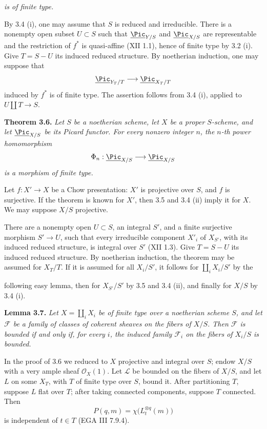 \emph{is of finite type.}

By 3.4 (i), one may assume that \(S\) is reduced and irreducible. There
is a nonempty open subset \(U\subset S\) such that
\(\underline{\Pic}_{Y/S}\) and \(\underline{\Pic}_{X/S}\) are
representable and the restriction of \(f^*\) is quasi-affine (XII 1.1),
hence of finite type by 3.2 (i). Give \(T=S-U\) its induced reduced
structure. By noetherian induction, one may suppose that
\[
\underline{\Pic}_{Y_T/T}\longrightarrow\underline{\Pic}_{X_T/T}
\]
induced by \(f^*\) is of finite type. The assertion follows from 3.4 (i),
applied to \(U\amalg T\to S\).

\textbf{Theorem 3.6.} \emph{Let \(S\) be a noetherian scheme, let \(X\)
be a proper \(S\)-scheme, and let \(\underline{\Pic}_{X/S}\) be its
Picard functor. For every nonzero integer \(n\), the \(n\)-th power
homomorphism}
\[
\Phi_n:\underline{\Pic}_{X/S}\longrightarrow\underline{\Pic}_{X/S}
\]
\emph{is a morphism of finite type.}

Let \(f:X'\to X\) be a Chow presentation: \(X'\) is projective over \(S\),
and \(f\) is surjective. If the theorem is known for \(X'\), then 3.5 and
3.4 (ii) imply it for \(X\). We may suppose \(X/S\) projective.

There are a nonempty open \(U\subset S\), an integral \(S'\), and a
finite surjective morphism \(S'\to U\), such that every irreducible
component \(X'_i\) of \(X_{S'}\), with its induced reduced structure, is
integral over \(S'\) (XII 1.3). Give \(T=S-U\) its induced reduced
structure. By noetherian induction, the theorem may be assumed for
\(X_T/T\). If it is assumed for all \(X_i/S'\), it follows for
\(\coprod_iX_i/S'\) by the

following easy lemma, then for \(X_{S'}/S'\) by 3.5 and 3.4 (ii), and
finally for \(X/S\) by 3.4 (i).

\textbf{Lemma 3.7.} \emph{Let \(X=\coprod_iX_i\) be of finite type over a
noetherian scheme \(S\), and let \(\mathcal F\) be a family of classes of
coherent sheaves on the fibers of \(X/S\). Then \(\mathcal F\) is bounded
if and only if, for every \(i\), the induced family \(\mathcal F_i\) on
the fibers of \(X_i/S\) is bounded.}

In the proof of 3.6 we reduced to \(X\) projective and integral over \(S\);
endow \(X/S\) with a very ample sheaf \(\mathcal O_X(1)\). Let
\(\mathscr L\) be bounded on the fibers of \(X/S\), and let \(L\) on some
\(X_T\), with \(T\) of finite type over \(S\), bound it. After
partitioning \(T\), suppose \(L\) flat over \(T\); after taking connected
components, suppose \(T\) connected. Then
\[
P(q,m)=\chi\bigl(L_t^{\otimes q}(m)\bigr)
\]
is independent of \(t\in T\) (EGA III 7.9.4).

